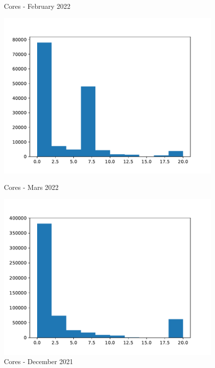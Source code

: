\documentclass[a4paper]{article}
\begin{document}
\begin{figure}[H]
\begin{minipage}[b]{0.5\linewidth}
    \caption{Cores - February 2022} 
    \vspace{4ex}
  \end{minipage} 
  \begin{minipage}[b]{0.5\linewidth}
    \centering
    \includegraphics[width=1.11\linewidth]{MBSS/plot/Distribution/2022_03_cores.pdf} 
    \caption{Cores - Mars 2022} 
    \vspace{4ex}
  \end{minipage}%
  \begin{minipage}[b]{0.5\linewidth}
    \centering
    \includegraphics[width=1.11\linewidth]{MBSS/plot/Distribution/2021_12_cores.pdf} 
    \caption{Cores - December 2021} 
    \vspace{4ex}
  \end{minipage}%
\end{figure}
\end{document}
